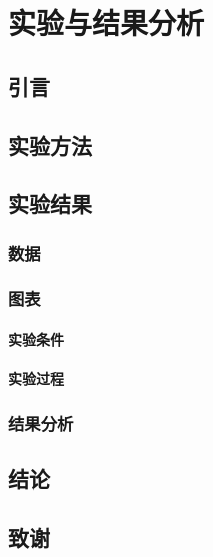 \documentclass{ctexbook}%
\begin{document}
  	\tableofcontents
  	
  	\chapter{实验与结果分析}
  	\section{引言} %
  	\section{实验方法}  
  	\section{实验结果}
  	\subsection{数据} %
  	\subsection{图表}
  	\subsubsection{实验条件} %
  	\subsubsection{实验过程}
  	\subsection{结果分析}
  	\section{结论}
  	\section{致谢}
  	
  
  	
\end{document}
